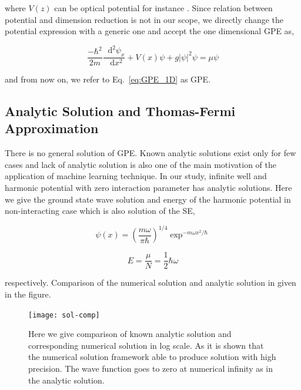 \documentclass[a4paper,times,hidelinks,12pt]{article}
\newcommand*\dif{\mathop{}\!\mathrm{d}}
\begin{document}
\noindent where $V(z)$ can be optical potential for instance \cite{zheng2013dynamics}. Since relation between potential and dimension reduction is not in our scope, we directly change the potential expression with a generic one and accept the one dimensional GPE as,

\begin{equation}
    \label{eq:GPE_1D}
    \frac{-\hbar^2}{2m}\frac{\dif^2\psi_x}{\dif x^2} + V(x)\psi + g|\psi|^2\psi = \mu\psi
\end{equation}

\noindent and from now on, we refer to Eq.~\eqref{eq:GPE_1D} as GPE.

\subsection{Analytic Solution and Thomas-Fermi Approximation}

There is no general solution of GPE. Known analytic solutions exist only for few cases and lack of analytic solution is also one of the main motivation of the application of machine learning technique. In our study, infinite well and harmonic potential with zero interaction parameter has analytic solutions. Here we give the ground state wave solution and energy of the harmonic potential in non-interacting case which is also solution of the SE,

\begin{equation}
\label{eq:harmonic_ground_state_wave}
    \psi(x) = (\frac{m\omega}{\pi\hbar})^{1/4}\exp^{-m\omega x^2/\hbar}
\end{equation}

\begin{equation}
\label{eq:GPE_1D_solution_harmonic}
    E = \frac{\mu}{N} = \frac{1}{2}\hbar\omega
\end{equation}

\noindent respectively. Comparison of the numerical solution and analytic solution in given in the figure.

\graphicspath{{"../figs/numericanalyze/"}}
\begin{figure}[H]
\centering
    \texttt{[image: sol-comp]}
\caption{Here we give comparison of known analytic solution and corresponding numerical solution in log scale. As it is shown that the numerical solution framework able to produce solution with high precision. The wave function goes to zero at numerical infinity as in the analytic solution.}
\label{fig:dens_energy_error}
\end{figure}
\end{document}
